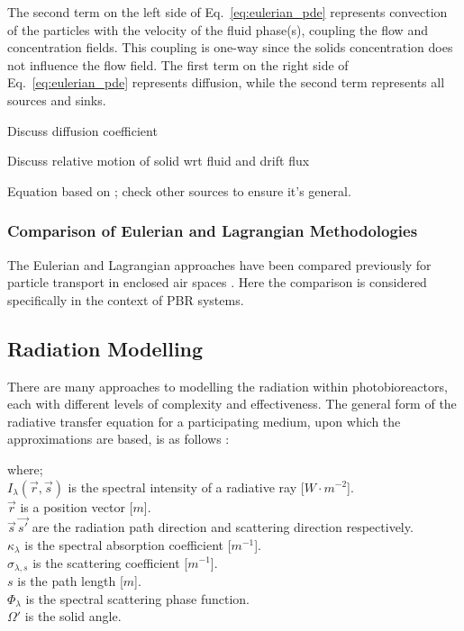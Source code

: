 


The second term on the left side of Eq.\ \ref{eq:eulerian_pde} represents convection of the particles with the velocity of the fluid phase(s), coupling the flow and concentration fields.  This coupling is one-way since the solids concentration does not influence the flow field.  The first term on the right side of Eq.\ \ref{eq:eulerian_pde} represents diffusion, while the second term represents all sources and sinks.

Discuss diffusion coefficient

Discuss relative motion of solid wrt fluid and drift flux

Equation based on \cite{zhang2007}; check other sources to ensure it's general.
%


\subsubsection{Comparison of Eulerian and Lagrangian Methodologies}

The Eulerian and Lagrangian approaches have been compared previously for particle transport in enclosed air spaces \cite{zhang2007}. Here the comparison is considered specifically in the context of PBR systems.


\subsection{Radiation Modelling}
\label{S:radiation}
There are many approaches to modelling the radiation within photobioreactors, each with different levels of complexity and effectiveness. The general form of the radiative transfer equation for a participating medium, upon which the approximations are based, is as follows \cite{modest2003}:



where;\\
$I_\lambda (\vec{r}, \vec{s})$ is the spectral intensity of a radiative ray [$W \cdot m^{-2}$]. \\
$\vec{r}$ is a position vector [$m$]. \\
$\vec{s} \, \vec{s'}$ are the radiation path direction and scattering direction respectively.\\
$\kappa_\lambda$ is the spectral absorption coefficient [$m^{-1}$]. \\
$\sigma_{\lambda, s}$ is the scattering coefficient [$m^{-1}$].  \\
$s$ is the path length [$m$]. \\
$\Phi_\lambda$ is the spectral scattering phase function. \\
$\Omega'$ is the solid angle. \\

